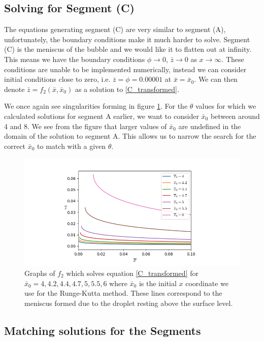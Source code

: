 \subsection{Solving for Segment (C)}

The equations generating segment (C) are very similar to segment (A), unfortunately, the boundary conditions make it much harder to solve. Segment (C) is the meniscus of the bubble and we would like it to flatten out at infinity. This means we have the boundary conditions $\phi \rightarrow 0$, $\bar{z} \rightarrow 0$ as $x \rightarrow \infty$. These conditions are unable to be implemented numerically, instead we can consider initial conditions close to zero, i.e. $\bar{z}=\phi=0.00001$ at $\bar{x}=\bar{x}_0$. We can then denote $\bar{z}=f_2(\bar{x},\bar{x}_0)$ as a solution to \ref{C_transformed}.

We once again see singularities forming in figure \ref{fig:7}. For the $\theta$ values for which we calculated solutions for segment A earlier, we want to consider $\bar{x}_0$ between around 4 and 8. We see from the figure that larger values of $\bar{x}_0$ are undefined in the domain of the solution to segment A. This allows us to narrow the search for the correct $\bar{x}_0$ to match with a given $\theta$.
\begin{figure}
    \centering
    \includegraphics[width=0.85\linewidth]{WriteUp/images/menisc.png}
    \caption{Graphs of $f_2$ which solves equation \ref{C_transformed} for $\bar{x}_0=4,4.2,4.4,4.7,5,5.5,6$ where $\bar{x}_0$ is the initial $x$ coordinate we use for the Runge-Kutta method. These lines correspond to the meniscus formed due to the droplet resting above the surface level.}
    \label{fig:7}
\end{figure}

\subsection{Matching solutions for the Segments}

